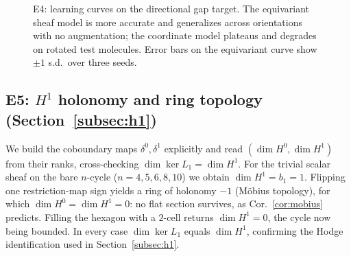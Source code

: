 \documentclass[pdflatex,sn-mathphys-num]{sn-jnl}%
\theoremstyle{thmstyleone}
\theoremstyle{thmstyletwo}
\theoremstyle{thmstylethree}
\begin{document}
\begin{figure}[t]
\centering
{}
\caption{E4: learning curves on the directional gap target. The equivariant sheaf
model is more accurate and generalizes across orientations with no augmentation;
the coordinate model plateaus and degrades on rotated test molecules. Error bars
on the equivariant curve show $\pm1$ s.d.\ over three seeds.}
\label{fig:e4}
\end{figure}

\subsection{E5: $H^1$ holonomy and ring topology (Section~\ref{subsec:h1})}\label{subsec:e5}
We build the coboundary maps $\delta^0,\delta^1$ explicitly and read
$(\dim H^0,\dim H^1)$ from their ranks, cross-checking $\dim\ker L_1=\dim H^1$.
For the trivial scalar sheaf on the bare $n$-cycle ($n=4,5,6,8,10$) we obtain
$\dim H^1=b_1=1$. Flipping one restriction-map sign yields a ring of holonomy
$-1$ (M\"obius topology), for which $\dim H^0=\dim H^1=0$: no flat section
survives, as Cor.~\ref{cor:mobius} predicts. Filling the hexagon with a $2$-cell
returns $\dim H^1=0$, the cycle now being bounded. In every case $\dim\ker L_1$
equals $\dim H^1$, confirming the Hodge identification used in
Section~\ref{subsec:h1}.
\end{document}
